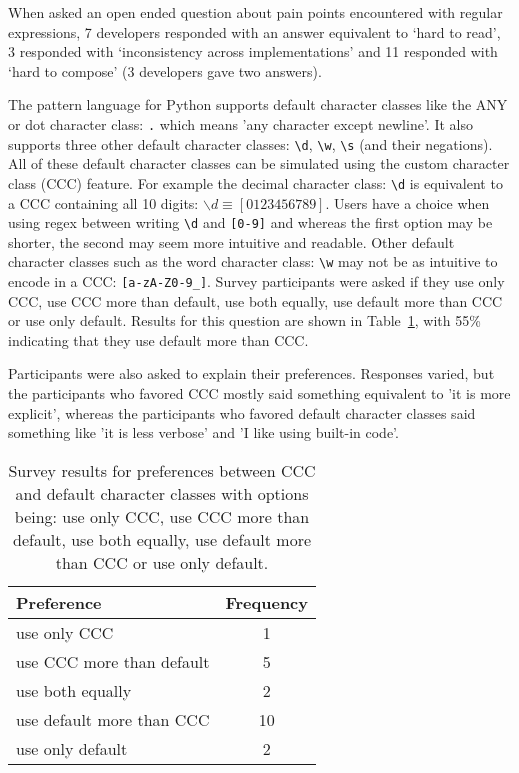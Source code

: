 When asked an open ended question about pain points encountered with regular expressions, 7 developers responded with an answer equivalent to `hard to read', 3 responded with `inconsistency across implementations' and 11 responded with `hard to compose' (3 developers gave two answers).

The pattern language for Python supports default character classes like the ANY or dot character class: \verb!.! which means 'any character except newline'.  It also supports three other default character classes: \verb!\d!, \verb!\w!, \verb!\s! (and their negations). All of these default character classes can be simulated using the custom character class (CCC) feature.  For example  the decimal character class: \verb!\d! is equivalent to a CCC containing all 10 digits: $\backslash d \equiv [0123456789]$.  Users have a choice when using regex between writing \verb!\d! and \verb![0-9]! and whereas the first option may be shorter, the second may seem more intuitive and readable.  Other default character classes such as the word character class: \verb!\w! may not be as intuitive to encode in a CCC: \verb![a-zA-Z0-9_]!.  Survey participants were asked if they use only CCC, use CCC more than default, use both equally, use default more than CCC or use only default.  Results for this question are shown in Table~\ref{tab:cccvsdefault}, with 55\% indicating that they use default more than CCC.

Participants were also asked to explain their preferences.  Responses varied, but the participants who favored CCC mostly said something equivalent to 'it is more explicit', whereas the participants who favored default character classes said something like 'it is less verbose' and 'I like using built-in code'.

\begin{table}
\caption{Survey results for preferences between CCC and default character classes with options being: use only CCC, use CCC more than default, use both equally, use default more than CCC or use only default. \label{tab:cccvsdefault}}
\begin{center}
\begin{tabular}{l|c}
Preference & Frequency \\ \hline
use only CCC & 1\\
use CCC more than default & 5 \\
use both equally & 2\\
use default more than CCC & 10\\
use only default & 2\\

\end{tabular}
\end{center}
\end{table}

